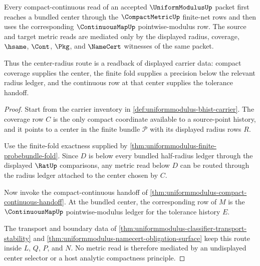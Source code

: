 \begin{theorem}
\label{thm:uniformmodulus-center-radius-readback}
Every compact-continuous read of an accepted $\UniformModulusUp$ packet first reaches a bundled center through the $\CompactMetricUp$ finite-net rows and then uses the corresponding $\ContinuousMapUp$ pointwise-modulus row. The source and target metric reads are mediated only by the displayed radius, coverage, $\hsame$, $\Cont$, $\Pkg$, and $\NameCert$ witnesses of the same packet.

Thus the center-radius route is a readback of displayed carrier data: compact coverage supplies the center, the finite fold supplies a precision below the relevant radius ledger, and the continuous row at that center supplies the tolerance handoff.
\end{theorem}
\begin{proof}
Start from the carrier inventory in \autoref{def:uniformmodulus-bhist-carrier}. The coverage row $C$ is the only compact coordinate available to a source-point history, and it points to a center in the finite bundle $\mathcal{P}$ with its displayed radius rows $R$.

Use the finite-fold exactness supplied by \autoref{thm:uniformmodulus-finite-probebundle-fold}. Since $D$ is below every bundled half-radius ledger through the displayed $\RatUp$ comparisons, any metric read below $D$ can be routed through the radius ledger attached to the center chosen by $C$.

Now invoke the compact-continuous handoff of \autoref{thm:uniformmodulus-compact-continuous-handoff}. At the bundled center, the corresponding row of $M$ is the $\ContinuousMapUp$ pointwise-modulus ledger for the tolerance history $E$.

The transport and boundary data of \autoref{thm:uniformmodulus-classifier-transport-stability} and \autoref{thm:uniformmodulus-namecert-obligation-surface} keep this route inside $L$, $Q$, $P$, and $N$. No metric read is therefore mediated by an undisplayed center selector or a host analytic compactness principle.
\end{proof}

